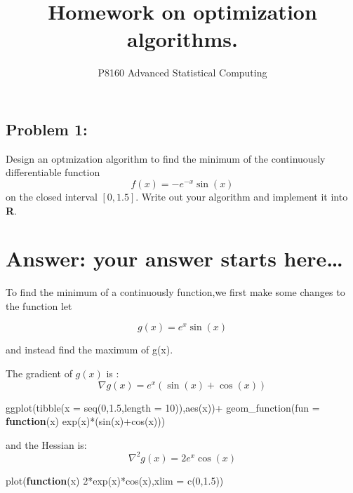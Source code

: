 \documentclass[
]{article}
\title{Homework on optimization algorithms.}
\author{}
\date{\vspace{-2.5em}P8160 Advanced Statistical Computing}
\newenvironment{Shaded}{\begin{snugshade}}{\end{snugshade}}
\newcommand{\AttributeTok}[1]{\textcolor[rgb]{0.77,0.63,0.00}{#1}}
\newcommand{\ControlFlowTok}[1]{\textcolor[rgb]{0.13,0.29,0.53}{\textbf{#1}}}
\newcommand{\DecValTok}[1]{\textcolor[rgb]{0.00,0.00,0.81}{#1}}
\newcommand{\FloatTok}[1]{\textcolor[rgb]{0.00,0.00,0.81}{#1}}
\newcommand{\FunctionTok}[1]{\textcolor[rgb]{0.00,0.00,0.00}{#1}}
\newcommand{\NormalTok}[1]{#1}
\newcommand{\SpecialCharTok}[1]{\textcolor[rgb]{0.00,0.00,0.00}{#1}}
\begin{document}
\maketitle

\hypertarget{problem-1}{%
\subsection{Problem 1:}\label{problem-1}}

Design an optmization algorithm to find the minimum of the continuously
differentiable function \[f(x) =-e^{-x}\sin(x)\] on the closed interval
\([0,1.5]\). Write out your algorithm and implement it into \textbf{R}.

\hypertarget{answer-your-answer-starts-here}{%
\section{Answer: your answer starts
here\ldots{}}\label{answer-your-answer-starts-here}}

To find the minimum of a continuously function,we first make some
changes to the function let

\[g(x) = e^{x}\sin(x)\]

and instead find the maximum of g(x).

The gradient of \(g(x)\) is : \[\nabla g(x) = e^x(\sin(x)+\cos(x))\]

\begin{Shaded}
\begin{Highlighting}[]
\FunctionTok{ggplot}\NormalTok{(}\FunctionTok{tibble}\NormalTok{(}\AttributeTok{x =} \FunctionTok{seq}\NormalTok{(}\DecValTok{0}\NormalTok{,}\FloatTok{1.5}\NormalTok{,}\AttributeTok{length =} \DecValTok{10}\NormalTok{)),}\FunctionTok{aes}\NormalTok{(x))}\SpecialCharTok{+}
  \FunctionTok{geom\_function}\NormalTok{(}\AttributeTok{fun =} \ControlFlowTok{function}\NormalTok{(x) }\FunctionTok{exp}\NormalTok{(x)}\SpecialCharTok{*}\NormalTok{(}\FunctionTok{sin}\NormalTok{(x)}\SpecialCharTok{+}\FunctionTok{cos}\NormalTok{(x)))}
\end{Highlighting}
\end{Shaded}

and the Hessian is: \[\nabla^2g(x) = 2e^x\cos(x)\]

\begin{Shaded}
\begin{Highlighting}[]
\FunctionTok{plot}\NormalTok{(}\ControlFlowTok{function}\NormalTok{(x) }\DecValTok{2}\SpecialCharTok{*}\FunctionTok{exp}\NormalTok{(x)}\SpecialCharTok{*}\FunctionTok{cos}\NormalTok{(x),}\AttributeTok{xlim =} \FunctionTok{c}\NormalTok{(}\DecValTok{0}\NormalTok{,}\FloatTok{1.5}\NormalTok{))}
\end{Highlighting}
\end{Shaded}
\end{document}
